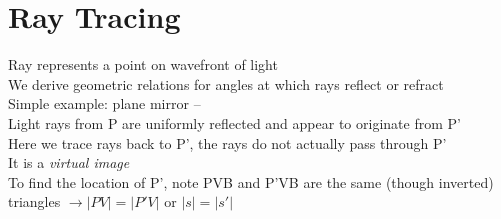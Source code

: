 \documentclass[a4paper, 11pt, fleqn, normalem]{report}
\begin{document}
\section{Ray Tracing}
Ray represents a point on wavefront of light \\
We derive geometric relations for angles at which rays reflect or refract \\
Simple example: plane mirror -- \\
Light rays from P are uniformly reflected and appear to originate from P' \\
Here we trace rays back to P', the rays do not actually pass through P' \\
It is a \emph{virtual image} \\
To find the location of P', note PVB and P'VB are the same (though inverted) triangles $\rightarrow |PV| = |P'V|$ or $|s| = |s'|$
\end{document}
